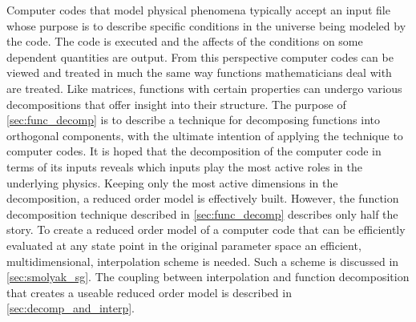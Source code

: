 
Computer codes that model physical phenomena typically accept an input file whose purpose is to describe specific conditions in the universe being modeled by the code. The code is executed and the affects of the conditions on some dependent quantities are output. From this perspective computer codes can be viewed and treated in much the same way functions mathematicians deal with are treated. Like matrices, functions with certain properties can undergo various decompositions that offer insight into their structure. The purpose of \ref{sec:func_decomp} is to describe a technique for decomposing functions into orthogonal components, with the ultimate intention of applying the technique to computer codes. It is hoped that the decomposition of the computer code in terms of its inputs reveals which inputs play the most active roles in the underlying physics. Keeping only the most active dimensions in the decomposition, a reduced order model is effectively built. However, the function decomposition technique described in \ref{sec:func_decomp} describes only half the story. To create a reduced order model of a computer code that can be efficiently evaluated at any state point in the original parameter space an efficient, multidimensional, interpolation scheme is needed. Such a scheme is discussed in \ref{sec:smolyak_sg}. The coupling between interpolation and function decomposition that creates a useable reduced order model is described in \ref{sec:decomp_and_interp}.    




